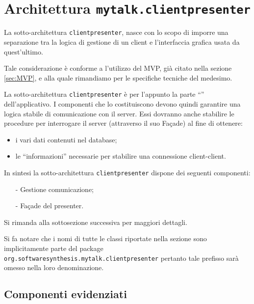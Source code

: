 \section{Architettura \texttt{mytalk.clientpresenter}}\label{sec:clientpresenter}
La sotto-architettura \texttt{clientpresenter}, nasce con lo scopo di imporre una separazione tra la logica di gestione di un client e l'interfaccia grafica usata da quest'ultimo.

Tale considerazione è conforme a l'utilizzo del  MVP, già citato nella sezione \ref{sec:MVP}, e alla quale rimandiamo per le specifiche tecniche del medesimo.

La sotto-architettura \texttt{clientpresenter} è per l'appunto la parte ``'' dell'applicativo. I componenti che lo costituiscono devono quindi garantire una logica stabile di comunicazione con il server. Essi dovranno anche stabilire le procedure per interrogare il server (attraverso il suo Façade) al fine di ottenere:
\begin{itemize}
	\item i vari dati contenuti nel database;
	\item le ``informazioni'' necessarie per stabilire una connessione client-client.
\end{itemize}

In sintesi la sotto-architettura \texttt{clientpresenter} dispone dei seguenti componenti:
\begin{itemize}[noitemsep,nolistsep]
	\item[-] Gestione comunicazione;
	\item[-] Façade del presenter.
\end{itemize}
Si rimanda alla sottosezione successiva per maggiori dettagli.

Si fa notare che i nomi di tutte le classi riportate nella sezione sono implicitamente parte del package \texttt{org.softwaresynthesis.mytalk.clientpresenter} pertanto tale prefisso sarà omesso nella loro denominazione.

\subsection{Componenti evidenziati}

